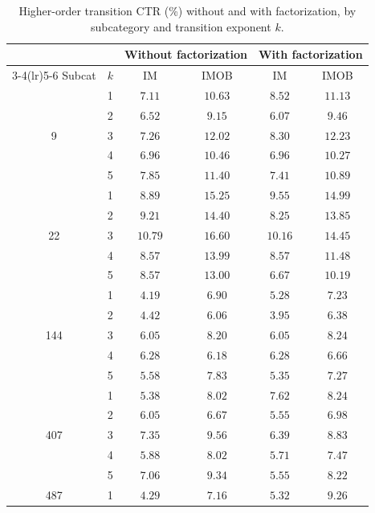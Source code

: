\begin{table}[ht]
  \centering
  \caption{Higher-order transition CTR (\%) without and with factorization, by
           subcategory and transition exponent $k$.}
  \label{tab:mf-ctr-higher}
  \small
  \begin{tabular}{clcccc}
    \toprule
    & & \multicolumn{2}{c}{Without factorization}
      & \multicolumn{2}{c}{With factorization} \\
    \cmidrule(lr){3-4}\cmidrule(lr){5-6}
    Subcat & $k$ & IM & IMOB & IM & IMOB \\
    \midrule
    \multirow{5}{*}{9}
      & 1 & $7.11$ & $10.63$ & $8.52$ & $11.13$ \\
      & 2 & $6.52$ & $9.15$  & $6.07$ & $9.46$ \\
      & 3 & $7.26$ & $12.02$ & $8.30$ & $12.23$ \\
      & 4 & $6.96$ & $10.46$ & $6.96$ & $10.27$ \\
      & 5 & $7.85$ & $11.40$ & $7.41$ & $10.89$ \\
    \midrule
    \multirow{5}{*}{22}
      & 1 & $8.89$  & $15.25$ & $9.55$  & $14.99$ \\
      & 2 & $9.21$  & $14.40$ & $8.25$  & $13.85$ \\
      & 3 & $10.79$ & $16.60$ & $10.16$ & $14.45$ \\
      & 4 & $8.57$  & $13.99$ & $8.57$  & $11.48$ \\
      & 5 & $8.57$  & $13.00$ & $6.67$  & $10.19$ \\
    \midrule
    \multirow{5}{*}{144}
      & 1 & $4.19$ & $6.90$ & $5.28$ & $7.23$ \\
      & 2 & $4.42$ & $6.06$ & $3.95$ & $6.38$ \\
      & 3 & $6.05$ & $8.20$ & $6.05$ & $8.24$ \\
      & 4 & $6.28$ & $6.18$ & $6.28$ & $6.66$ \\
      & 5 & $5.58$ & $7.83$ & $5.35$ & $7.27$ \\
    \midrule
    \multirow{5}{*}{407}
      & 1 & $5.38$ & $8.02$ & $7.62$ & $8.24$ \\
      & 2 & $6.05$ & $6.67$ & $5.55$ & $6.98$ \\
      & 3 & $7.35$ & $9.56$ & $6.39$ & $8.83$ \\
      & 4 & $5.88$ & $8.02$ & $5.71$ & $7.47$ \\
      & 5 & $7.06$ & $9.34$ & $5.55$ & $8.22$ \\
    \midrule
    \multirow{5}{*}{487}
      & 1 & $4.29$ & $7.16$ & $5.32$ & $9.26$ \\

\end{tabular}
\end{table}
